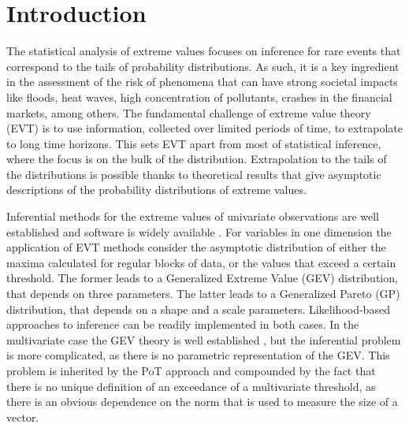 
\section{Introduction}
The statistical analysis of extreme values focuses on inference for
rare events that correspond to the tails of probability distributions.
As such, it is a key ingredient in the assessment of the risk of
phenomena that can have strong societal impacts like floods, heat waves,
high concentration of pollutants, crashes in the financial markets,
among others. The fundamental challenge of extreme value theory (EVT) is
to use information, collected over limited periods of time, to
extrapolate to long time horizons. This sets EVT apart from most of
statistical inference, where the focus is on the bulk of the
distribution. Extrapolation to the tails of the distributions is
possible thanks to theoretical results that give asymptotic descriptions
of the probability distributions of extreme values. 

Inferential methods for the extreme values of univariate observations
are well established and software is widely available \cite[see, for
example,][]{coles2001}. For variables in one dimension the application of EVT methods consider the asymptotic distribution of either the maxima calculated for regular blocks of data, or the values that exceed a certain threshold. The former leads to a Generalized Extreme Value (GEV) distribution, that depends on three parameters. The latter leads to a Generalized Pareto (GP) distribution, that depends on a shape and a scale parameters. Likelihood-based approaches to inference can be readily implemented in both cases.
In the multivariate case the GEV theory is well established \citep[see, for example][]{dehaan2006}, but the inferential problem is more complicated, as there is no parametric representation of the GEV. This problem is inherited by the PoT approach and compounded by the fact that there is no unique definition of an exceedance of a multivariate threshold, as there is an obvious dependence on the norm that is used to measure the size of a vector. 

